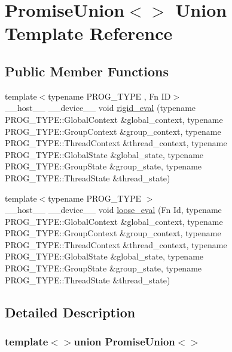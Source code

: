 \hypertarget{unionPromiseUnion_3_4}{\section{Promise\-Union$<$$>$ Union Template Reference}
\label{unionPromiseUnion_3_4}
}
\subsection*{Public Member Functions}
\begin{DoxyCompactItemize}
\item 
{\footnotesize template$<$typename P\-R\-O\-G\-\_\-\-T\-Y\-P\-E , Fn I\-D$>$ }\\\-\_\-\-\_\-host\-\_\-\-\_\- \-\_\-\-\_\-device\-\_\-\-\_\- void \hyperlink{unionPromiseUnion_3_4_a6355cf0550f6577dfd47361b440c67e7}{rigid\-\_\-eval} (typename P\-R\-O\-G\-\_\-\-T\-Y\-P\-E\-::\-Global\-Context \&global\-\_\-context, typename P\-R\-O\-G\-\_\-\-T\-Y\-P\-E\-::\-Group\-Context \&group\-\_\-context, typename P\-R\-O\-G\-\_\-\-T\-Y\-P\-E\-::\-Thread\-Context \&thread\-\_\-context, typename P\-R\-O\-G\-\_\-\-T\-Y\-P\-E\-::\-Global\-State \&global\-\_\-state, typename P\-R\-O\-G\-\_\-\-T\-Y\-P\-E\-::\-Group\-State \&group\-\_\-state, typename P\-R\-O\-G\-\_\-\-T\-Y\-P\-E\-::\-Thread\-State \&thread\-\_\-state)
\item 
{\footnotesize template$<$typename P\-R\-O\-G\-\_\-\-T\-Y\-P\-E $>$ }\\\-\_\-\-\_\-host\-\_\-\-\_\- \-\_\-\-\_\-device\-\_\-\-\_\- void \hyperlink{unionPromiseUnion_3_4_a06208de8718d60ced44b3dfd2df32177}{loose\-\_\-eval} (Fn Id, typename P\-R\-O\-G\-\_\-\-T\-Y\-P\-E\-::\-Global\-Context \&global\-\_\-context, typename P\-R\-O\-G\-\_\-\-T\-Y\-P\-E\-::\-Group\-Context \&group\-\_\-context, typename P\-R\-O\-G\-\_\-\-T\-Y\-P\-E\-::\-Thread\-Context \&thread\-\_\-context, typename P\-R\-O\-G\-\_\-\-T\-Y\-P\-E\-::\-Global\-State \&global\-\_\-state, typename P\-R\-O\-G\-\_\-\-T\-Y\-P\-E\-::\-Group\-State \&group\-\_\-state, typename P\-R\-O\-G\-\_\-\-T\-Y\-P\-E\-::\-Thread\-State \&thread\-\_\-state)
\end{DoxyCompactItemize}


\subsection{Detailed Description}
\subsubsection*{template$<$$>$union Promise\-Union$<$$>$}

